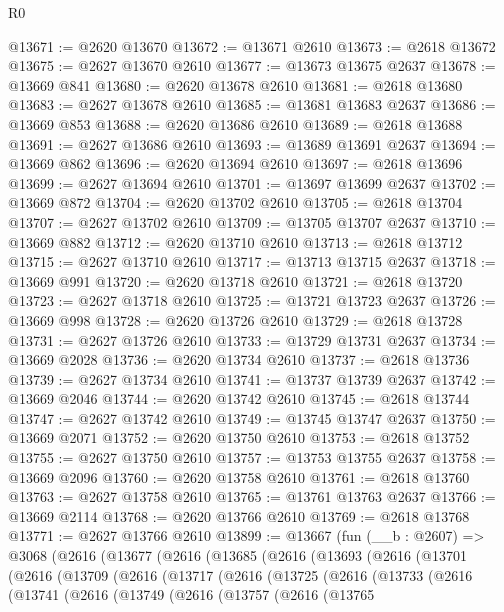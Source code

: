\begin{lexlean}{R0}
\begin{coremodule}
@13671 := @2620 @13670
@13672 := @13671 @2610
@13673 := @2618 @13672
@13675 := @2627 @13670 @2610
@13677 := @13673 @13675 @2637
@13678 := @13669 @841
@13680 := @2620 @13678 @2610
@13681 := @2618 @13680
@13683 := @2627 @13678 @2610
@13685 := @13681 @13683 @2637
@13686 := @13669 @853
@13688 := @2620 @13686 @2610
@13689 := @2618 @13688
@13691 := @2627 @13686 @2610
@13693 := @13689 @13691 @2637
@13694 := @13669 @862
@13696 := @2620 @13694 @2610
@13697 := @2618 @13696
@13699 := @2627 @13694 @2610
@13701 := @13697 @13699 @2637
@13702 := @13669 @872
@13704 := @2620 @13702 @2610
@13705 := @2618 @13704
@13707 := @2627 @13702 @2610
@13709 := @13705 @13707 @2637
@13710 := @13669 @882
@13712 := @2620 @13710 @2610
@13713 := @2618 @13712
@13715 := @2627 @13710 @2610
@13717 := @13713 @13715 @2637
@13718 := @13669 @991
@13720 := @2620 @13718 @2610
@13721 := @2618 @13720
@13723 := @2627 @13718 @2610
@13725 := @13721 @13723 @2637
@13726 := @13669 @998
@13728 := @2620 @13726 @2610
@13729 := @2618 @13728
@13731 := @2627 @13726 @2610
@13733 := @13729 @13731 @2637
@13734 := @13669 @2028
@13736 := @2620 @13734 @2610
@13737 := @2618 @13736
@13739 := @2627 @13734 @2610
@13741 := @13737 @13739 @2637
@13742 := @13669 @2046
@13744 := @2620 @13742 @2610
@13745 := @2618 @13744
@13747 := @2627 @13742 @2610
@13749 := @13745 @13747 @2637
@13750 := @13669 @2071
@13752 := @2620 @13750 @2610
@13753 := @2618 @13752
@13755 := @2627 @13750 @2610
@13757 := @13753 @13755 @2637
@13758 := @13669 @2096
@13760 := @2620 @13758 @2610
@13761 := @2618 @13760
@13763 := @2627 @13758 @2610
@13765 := @13761 @13763 @2637
@13766 := @13669 @2114
@13768 := @2620 @13766 @2610
@13769 := @2618 @13768
@13771 := @2627 @13766 @2610
@13899 := @13667
    (fun (__b : @2607) =>
    @3068
      (@2616
        (@13677
          (@2616
            (@13685
              (@2616
                (@13693
                  (@2616
                    (@13701
                      (@2616
                        (@13709
                          (@2616
                            (@13717
                              (@2616
                                (@13725
                                  (@2616
                                    (@13733
                                      (@2616
                                        (@13741
                                          (@2616
                                            (@13749
                                              (@2616
                                                (@13757
                                                  (@2616
                                                    (@13765

\end{coremodule}
\end{lexlean}
